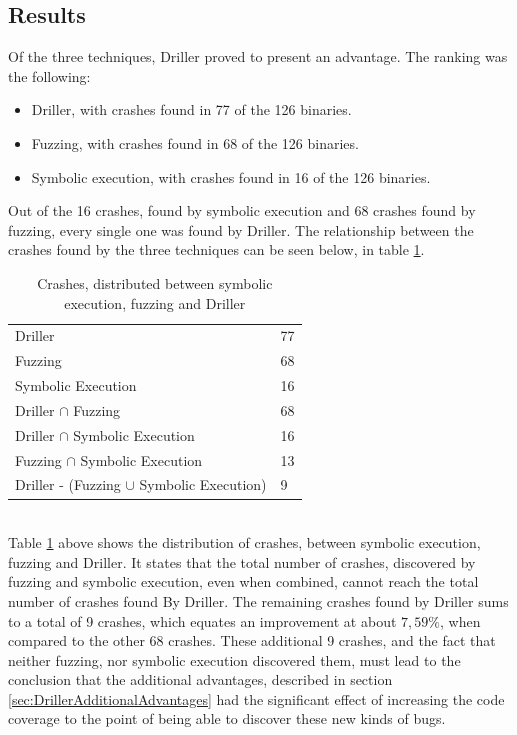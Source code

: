 \documentclass[a4paper]{article}
\begin{document}
\subsection{Results}
\label{sec:Results}
Of the three techniques, Driller proved to present an advantage. The ranking was the following:
\begin{itemize}[noitemsep]
	\item[1:] Driller, with crashes found in 77 of the 126 binaries.
	\item[2:] Fuzzing, with crashes found in 68 of the 126 binaries.
	\item[3:] Symbolic execution, with crashes found in 16 of the 126 binaries.
\end{itemize}
Out of the 16 crashes, found by symbolic execution and 68 crashes found by fuzzing, every single one was found by Driller. The relationship between the crashes found by the three techniques can be seen below, in table \ref{UnionCrash}. \\
\begin{table}[h!]
	\begin{center}
		\begin{tabular}{l|l}\hline
		Driller                                 & 77 \\
		Fuzzing                                  & 68 \\
		Symbolic Execution                        & 16 \\
		Driller $\cap$ Fuzzing                     & 68 \\
		Driller $\cap$ Symbolic Execution           & 16 \\
		Fuzzing $\cap$ Symbolic Execution            & 13 \\
		Driller - (Fuzzing $\cup$ Symbolic Execution) & 9
		\end{tabular}
		\caption{Crashes, distributed between symbolic execution, fuzzing and Driller}
		\label{UnionCrash}
	\end{center}
\end{table}\\
Table \ref{UnionCrash} above shows the distribution of crashes, between symbolic execution, fuzzing and Driller. It states that the total number of crashes, discovered by fuzzing and symbolic execution, even when combined, cannot reach the total number of crashes found By Driller. The remaining crashes found by Driller sums to a total of 9 crashes, which equates an improvement at about $7,59\%$, when compared to the other 68 crashes. These additional 9 crashes, and the fact that neither fuzzing, nor symbolic execution discovered them, must lead to the conclusion that the additional advantages, described in section \ref{sec:DrillerAdditionalAdvantages} had the significant effect of increasing the code coverage to the point of being able to discover these new kinds of bugs.
\end{document}
